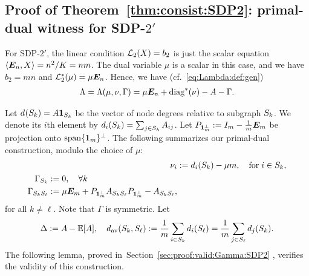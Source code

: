 
\subsection{Proof of Theorem~\ref{thm:consist:SDP2}: primal-dual witness for SDP-$2'$}\label{sec:proof:consist:SDP2}
For SDP-$2'$, the linear condition $\mathcal{L}_2(X) = b_2$ is just the scalar equation $\langle \bm{E}_n,X\rangle = n^2/K = n m$. The dual variable $\mu$ is a scalar in this case, and we have $b_2 = m n$ and $\mathcal{L}_2^*(\mu) = \mu \bm{E}_n$. Hence, 
we have (cf.~\eqref{eq:Lambda:def:gen})
\begin{align}\label{eq:Lambda:def:SDP2}
  \Lambda = \Lambda(\mu,\nu,\Gamma) = \mu \bm{E}_n + \operatorname{diag}^*(\nu) -A - \Gamma .
\end{align}


Let $d_{}(S_{k}) = A \bm{1}_{S_{k}}$ be the vector of node degrees relative to subgraph $S_{k}$. We denote its $i$th element by $d_{i}(S_{k}) = \sum_{j \in S_{k}} A_{ij}$.  Let $P_{\bm{1}_m^\perp} := I_m - \frac1m \bm{E}_m$ be projection onto $\operatorname{span}\{\bm{1}_m\}^\perp$. The following summarizes our primal-dual construction, modulo the choice of $\mu$:
\begin{align}\label{eq:nu:def}
  \nu_i &:=   d_{i}(S_{k}) - \mu m, \quad \text{for} \;i \in S_k,\\
  \begin{split}
  \label{eq:Gamma:def}
  \Gamma_{S_{k}} &:= 0, \quad  \forall k \\
  \Gamma_{S_{k}S_{\ell}} &:= 
    \mu \bm{E}_m + P_{\bm{1}_m^\perp} A_{S_{k}S_{\ell}} P_{\bm{1}_m^\perp} - A_{S_{k}S_{\ell}},
\end{split}
\end{align}
for all $k \neq \ell$.  Note that $\Gamma$ is symmetric. Let
\begin{align}\label{eq:dav:def}
    \Delta := A - \mathbb{E}[A], \quad d_{\text{av}}(S_{k},S_{\ell}) := \frac1m \sum_{i \in S_{k}} d_{i}(S_{\ell}) =
       \frac1m \sum_{j \in S_{\ell}} d_{j}(S_{k}).
\end{align}
 The following lemma, proved in~Section~\ref{sec:proof:valid:Gamma:SDP2}
 , verifies the validity of this construction.

